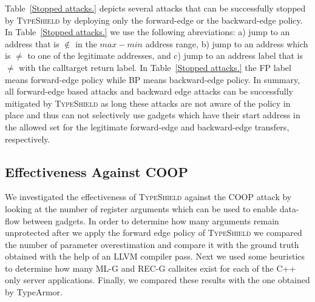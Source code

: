 Table~\ref{Stopped attacks.} depicts several attacks that can be successfully stopped by \textsc{TypeShield}
by deploying only the forward-edge or the backward-edge policy. 
In Table~\ref{Stopped attacks.}  we use the following abreviations: a) jump to an address that is $\notin$ in the $max - min$ address range,
b) jump to an address which is $\ne$ to one of the legitimate addresses, and 
c) jump to an address label that is $\ne$ with the calltarget return label.
In Table~\ref{Stopped attacks.} the FP label means forward-edge policy while BP means backward-edge policy. 
In summary, all forward-edge based attacks 
and backward edge attacks can be successfully mitigated by \textsc{TypeShield} as long these attacks are not 
aware of the policy in place and thus can not selectively use gadgets which have their start address in the 
allowed set for the legitimate forward-edge and backward-edge transfers, respectively.

\subsection{Effectiveness Against COOP}
\label{RQ8: Effectiveness Against COOP}
We investigated the effectiveness of \textsc{TypeShield} against the COOP
attack by looking at the number of register arguments which can be used to enable 
data-flow between gadgets. In order to determine how many arguments 
remain unprotected after we apply the forward edge policy of \textsc{TypeShield}
we compared the number of parameter overestimation and compare it with the ground truth
obtained with the help of an LLVM compiler pass. Next we used some heuristics to determine 
how many ML-G and REC-G callsites exist for each of the C++ only server applications.
Finally, we compared these results with the one obtained by TypeArmor.

